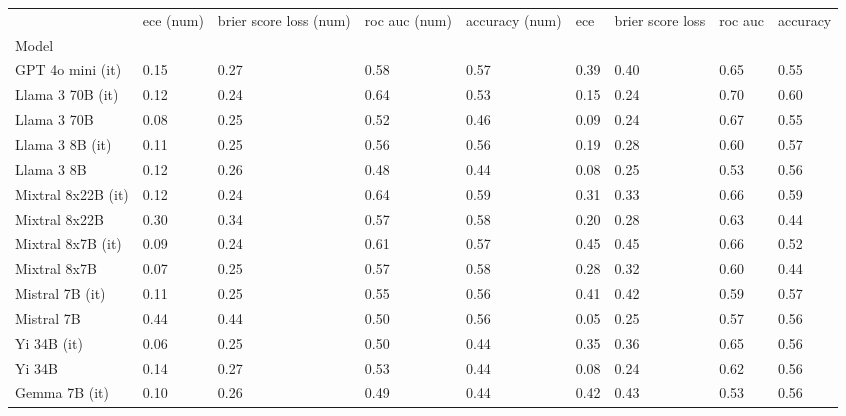 \begin{tabular}{lllllllll}
\toprule
 & ece (num) & brier score loss (num) & roc auc (num) & accuracy (num) & ece & brier score loss & roc auc & accuracy \\
Model &  &  &  &  &  &  &  &  \\
\midrule
GPT 4o mini (it) & 0.15 & 0.27 & 0.58 & 0.57 & 0.39 & 0.40 & 0.65 & 0.55 \\
Llama 3 70B (it) & 0.12 & \cellcolor{cyan!22.5} 0.24 & \cellcolor{cyan!25.0} 0.64 & 0.53 & 0.15 & \cellcolor{cyan!22.6} 0.24 & \cellcolor{cyan!25.0} 0.70 & \cellcolor{cyan!25.0} 0.60 \\
Llama 3 70B & 0.08 & \cellcolor{cyan!12.4} 0.25 & 0.52 & 0.46 & 0.09 & \cellcolor{cyan!21.4} 0.24 & 0.67 & 0.55 \\
Llama 3 8B (it) & 0.11 & \cellcolor{cyan!12.4} 0.25 & 0.56 & 0.56 & 0.19 & 0.28 & 0.60 & 0.57 \\
Llama 3 8B & 0.12 & 0.26 & \cellcolor{orange!25.0} 0.48 & \cellcolor{orange!25.0} 0.44 & 0.08 & \cellcolor{cyan!7.1} 0.25 & 0.53 & 0.56 \\
Mixtral 8x22B (it) & 0.12 & \cellcolor{cyan!23.7} 0.24 & \cellcolor{cyan!23.5} 0.64 & \cellcolor{cyan!25.0} 0.59 & 0.31 & 0.33 & 0.66 & \cellcolor{cyan!17.1} 0.59 \\
Mixtral 8x22B & 0.30 & 0.34 & 0.57 & \cellcolor{cyan!2.4} 0.58 & 0.20 & 0.28 & 0.63 & \cellcolor{orange!25.0} 0.44 \\
Mixtral 8x7B (it) & 0.09 & \cellcolor{cyan!25.0} 0.24 & 0.61 & 0.57 & \cellcolor{orange!25.0} 0.45 & \cellcolor{orange!25.0} 0.45 & 0.66 & 0.52 \\
Mixtral 8x7B & 0.07 & \cellcolor{cyan!16.2} 0.25 & 0.57 & \cellcolor{cyan!2.4} 0.58 & 0.28 & 0.32 & 0.60 & \cellcolor{orange!25.0} 0.44 \\
Mistral 7B (it) & 0.11 & \cellcolor{cyan!11.2} 0.25 & 0.55 & 0.56 & \cellcolor{orange!2.7} 0.41 & 0.42 & 0.59 & 0.57 \\
Mistral 7B & \cellcolor{orange!25.0} 0.44 & \cellcolor{orange!25.0} 0.44 & 0.50 & 0.56 & \cellcolor{cyan!22.5} 0.05 & \cellcolor{cyan!14.2} 0.25 & 0.57 & 0.56 \\
Yi 34B (it) & \cellcolor{cyan!3.7} 0.06 & \cellcolor{cyan!11.2} 0.25 & 0.50 & \cellcolor{orange!25.0} 0.44 & 0.35 & 0.36 & 0.65 & 0.56 \\
Yi 34B & 0.14 & 0.27 & 0.53 & \cellcolor{orange!25.0} 0.44 & \cellcolor{cyan!4.5} 0.08 & \cellcolor{cyan!25.0} 0.24 & 0.62 & 0.56 \\
Gemma 7B (it) & 0.10 & \cellcolor{cyan!4.9} 0.26 & \cellcolor{orange!4.9} 0.49 & \cellcolor{orange!25.0} 0.44 & \cellcolor{orange!12.0} 0.42 & 0.43 & 0.53 & 0.56 \\

\end{tabular}
